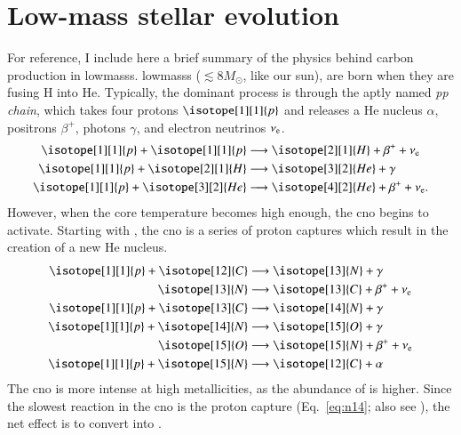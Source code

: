 \documentclass[12pt,oneside,letterpaper]{report}
\newcommand{\proton}{\isotope[1][1]{p}}
\begin{document}
\newpage
\section{Low-mass stellar evolution}\label{sec:stel_evo}
For reference, I include here a brief summary of the physics behind carbon production in \glspl{lowmass}.
\Glspl{lowmass} ($\lesssim 8 M_\odot$, like our sun), are born when they are fusing H into He. Typically, the dominant process is through the aptly named \textit{pp chain}, which takes four protons $\proton$ and releases a He nucleus $\alpha$, positrons $\beta^{+}$, photons $\gamma$, and electron neutrinos $\nu_{\rm e}$.
\begin{subequations}
    \begin{align}
        \proton + \proton &\longrightarrow \isotope[2][1]{H} + \beta^+ + \nu_{\rm e} \\
        \proton + \isotope[2][1]{H} &\longrightarrow \isotope[3][2]{He} + \gamma\\
        \proton + \isotope[3][2]{He} &\longrightarrow \isotope[4][2]{He} + \beta^+ + \nu_{\rm e}.
    \end{align}
\end{subequations}
However, when the core temperature becomes high enough, the \gls{cno} begins to activate. Starting with , the \gls{cno} is a series of proton captures which result in the creation of a new He nucleus.
\begin{subequations}\label{eq:cno_cycle}
\begin{align}
    \proton + \isotope[12]{C} &\longrightarrow \isotope[13]{N} + \gamma \\
    \isotope[13]{N} &\longrightarrow  \isotope[13]{C} + \beta^+ + \nu_{\rm e}  \\
    \proton + \isotope[13]{C}  &\longrightarrow \isotope[14]{N} + \gamma\\
    \proton + \isotope[14]{N}  &\longrightarrow \isotope[15]{O} + \gamma \label{eq:n14}\\
    \isotope[15]{O} &\longrightarrow  \isotope[15]{N} + \beta^{+} + \nu_{\rm e} \\
    \proton + \isotope[15]{N} &\longrightarrow \isotope[12]{C} + \alpha
\end{align}
\end{subequations}
The \gls{cno} is more intense at high metallicities, as the abundance of  is higher. Since the slowest reaction in the \gls{cno} is the  proton capture (Eq.~\ref{eq:n14}; also see \citealt{solar-fusion}), the net effect is to convert  into . 
\end{document}
